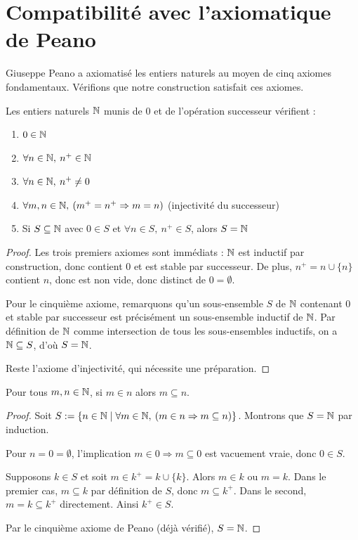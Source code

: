 \section*{Compatibilité avec l'axiomatique de Peano}

Giuseppe Peano a axiomatisé les entiers naturels au moyen de cinq axiomes fondamentaux. Vérifions que notre construction satisfait ces axiomes.

\begin{theoreme}
Les entiers naturels $\mathbb{N}$ munis de $0$ et de l'opération successeur vérifient :
\begin{enumerate}
	\item $0\in \mathbb{N}$
	\item $\forall n \in \mathbb{N}, \: n^+\in \mathbb{N}$
	\item $\forall n\in \mathbb{N}, \: n^+\neq 0$
	\item $\forall m, n \in \mathbb{N}, \: (m^+=n^+ \Rightarrow m=n)$ (injectivité du successeur)
	\item Si $S \subseteq \mathbb{N}$ avec $0\in S$ et $\forall n\in S, \: n^+\in S$, alors $S= \mathbb{N}$
\end{enumerate}
\end{theoreme}

\begin{proof}
Les trois premiers axiomes sont immédiats : $\mathbb{N}$ est inductif par construction, donc contient $0$ et est stable par successeur. De plus, $n^+ = n \cup \{n\}$ contient $n$, donc est non vide, donc distinct de $0 = \emptyset$.

Pour le cinquième axiome, remarquons qu'un sous-ensemble $S$ de $\mathbb{N}$ contenant $0$ et stable par successeur est précisément un sous-ensemble inductif de $\mathbb{N}$. Par définition de $\mathbb{N}$ comme intersection de tous les sous-ensembles inductifs, on a $\mathbb{N} \subseteq S$, d'où $S = \mathbb{N}$.

Reste l'axiome d'injectivité, qui nécessite une préparation.
\end{proof}

\begin{lemme}\label{ens : naturels : ordre}
	Pour tous $m,n\in \mathbb{N}$, si $m\in n$ alors $m\subseteq n$.
\end{lemme}

\begin{proof}
	Soit $S:=\{n\in \mathbb{N} \mid \forall m\in \mathbb{N}, \: (m \in n \Rightarrow m\subseteq n)\}$. Montrons que $S = \mathbb{N}$ par induction.
    
    Pour $n = 0 = \emptyset$, l'implication $m \in 0 \Rightarrow m \subseteq 0$ est vacuement vraie, donc $0 \in S$.
	
    Supposons $k\in S$ et soit $m \in k^+ = k\cup \{k\}$. Alors $m \in k$ ou $m = k$. Dans le premier cas, $m\subseteq k$ par définition de $S$, donc $m\subseteq k^+$. Dans le second, $m = k \subseteq k^+$ directement. Ainsi $k^+\in S$.
    
	Par le cinquième axiome de Peano (déjà vérifié), $S = \mathbb{N}$.
\end{proof}

